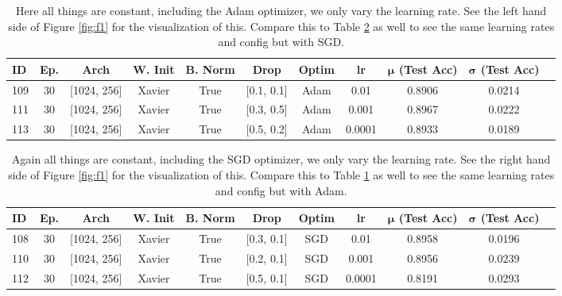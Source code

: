 \documentclass[11pt]{amsart}
\begin{document}
\begin{table}[h]
    \centering
    \begin{tabular}{|l|c|c|c|c|c|c|c|c|c|c|} %
        \hline
        \textbf{ID} & \textbf{Ep.}
        & \textbf{Arch} & \textbf{W. Init}
        & \textbf{B. Norm} & \textbf{Drop}
        & \textbf{Optim} & \textbf{lr}
	& \textbf{$\bm \mu$ (Test Acc)}
        & \textbf{$\bm \sigma$ (Test Acc)} \\ 
        \hline
        109 & 30 & [1024, 256]  & Xavier & True & [0.1, 0.1] & Adam & 0.01 & 0.8906 & 0.0214 \\
        \hline
        111 & 30 & [1024, 256]  & Xavier & True & [0.3, 0.5] & Adam & 0.001 & 0.8967 & 0.0222 \\
        \hline
        113 & 30 & [1024, 256]  & Xavier & True & [0.5, 0.2] & Adam & 0.0001 & 0.8933 & 0.0189 \\  
        \hline
    \end{tabular}
    \caption{Here all things are constant, including the Adam optimizer, we only vary the learning rate.
    See the left hand side of Figure \ref{fig:f1} for the visualization of this.
    Compare this to Table \ref{tab:tab3} as well to see the same learning rates and config but with SGD.}
    \label{tab:tab2}
\end{table}

\begin{table}[h]
    \centering
    \begin{tabular}{|l|c|c|c|c|c|c|c|c|c|c|} %
        \hline
        \textbf{ID} & \textbf{Ep.}
        & \textbf{Arch} & \textbf{W. Init}
        & \textbf{B. Norm} & \textbf{Drop}
        & \textbf{Optim} & \textbf{lr}
	& \textbf{$\bm \mu$ (Test Acc)}
        & \textbf{$\bm \sigma$ (Test Acc)} \\ 
        \hline
        108 & 30 & [1024, 256]  & Xavier & True & [0.3, 0.1] & SGD & 0.01 & 0.8958 & 0.0196 \\
        \hline
        110 & 30 & [1024, 256]  & Xavier & True & [0.2, 0.1] & SGD & 0.001 & 0.8956 & 0.0239 \\
        \hline
        112 & 30 & [1024, 256]  & Xavier & True & [0.5, 0.1] & SGD & 0.0001 & 0.8191 & 0.0293 \\  
        \hline
    \end{tabular}
    \caption{
    Again all things are constant, including the SGD optimizer, we only vary the learning rate.
    See the right hand side of Figure \ref{fig:f1} for the visualization of this.
    Compare this to Table \ref{tab:tab2} as well to see the same learning rates and config but with Adam.
    }
    \label{tab:tab3}
\end{table}
\end{document}
